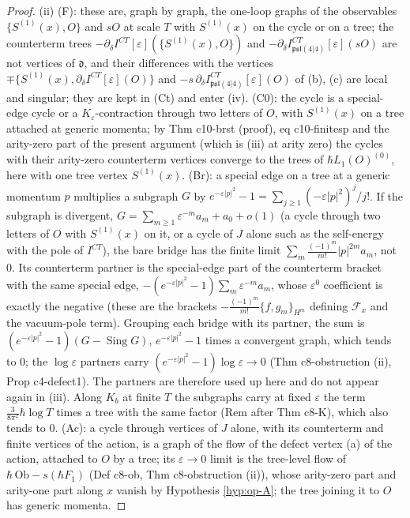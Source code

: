 \documentclass[11pt]{article}
\numberwithin{equation}{section}
\theoremstyle{plain}
\theoremstyle{definition}
\newcommand{\psl}{\mathfrak{psl}(4|4)}
\begin{document}
\begin{proof}
(ii) (F): these are, graph by graph, the one-loop graphs of the observables $\{S^{(1)}(x),O\}$ and $sO$ at scale $T$ with $S^{(1)}(x)$ on the cycle or on a tree; the counterterm trees $-\partial_\delta I^{CT}[\varepsilon](\{S^{(1)}(x),O\})$ and $-\partial_\delta I^{CT}_{\psl}[\varepsilon](sO)$ are not vertices of $\mathfrak d$, and their differences with the vertices $\mp\{S^{(1)}(x),\partial_\delta I^{CT}[\varepsilon](O)\}$ and $-s\,\partial_\delta I^{CT}_{\psl}[\varepsilon](O)$ of (b), (c) are local and singular; they are kept in (Ct) and enter (iv). (C0): the cycle is a special-edge cycle or a $K_\varepsilon$-contraction through two letters of $O$, with $S^{(1)}(x)$ on a tree attached at generic momenta; by Thm c10-brst (proof), eq c10-finitesp and the arity-zero part of the present argument (which is (iii) at arity zero) the cycles with their arity-zero counterterm vertices converge to the trees of $\hbar L_1(O)^{(0)}$, here with one tree vertex $S^{(1)}(x)$. (Br): a special edge on a tree at a generic momentum $p$ multiplies a subgraph $G$ by $e^{-\varepsilon|p|^2}-1=\sum_{j\ge1}(-\varepsilon|p|^2)^j/j!$. If the subgraph is divergent, $G=\sum_{m\ge1}\varepsilon^{-m}a_m+a_0+o(1)$ (a cycle through two letters of $O$ with $S^{(1)}(x)$ on it, or a cycle of $J$ alone such as the self-energy with the pole of $I^{CT}$), the bare bridge has the finite limit $\sum_m\frac{(-1)^m}{m!}|p|^{2m}a_m$, not $0$. Its counterterm partner is the special-edge part of the counterterm bracket with the same special edge, $-(e^{-\varepsilon|p|^2}-1)\sum_m\varepsilon^{-m}a_m$, whose $\varepsilon^0$ coefficient is exactly the negative (these are the brackets $-\frac{(-1)^m}{m!}\{f,g_m\}_{H^m}$ defining $\mathcal F_x$ and the vacuum-pole term). Grouping each bridge with its partner, the sum is $(e^{-\varepsilon|p|^2}-1)(G-\operatorname{Sing}G)$, $e^{-\varepsilon|p|^2}-1$ times a convergent graph, which tends to $0$; the $\log\varepsilon$ partners carry $(e^{-\varepsilon|p|^2}-1)\log\varepsilon\to0$ (Thm c8-obstruction (ii), Prop c4-defect1). The partners are therefore used up here and do not appear again in (iii). Along $K_b$ at finite $T$ the subgraphs carry at fixed $\varepsilon$ the term $\tfrac3{8\pi^2}\hbar\log T$ times a tree with the same factor (Rem after Thm c8-K), which also tends to $0$. (Ac): a cycle through vertices of $J$ alone, with its counterterm and finite vertices of the action, is a graph of the flow of the defect vertex (a) of the action, attached to $O$ by a tree; its $\varepsilon\to0$ limit is the tree-level flow of $\hbar\,\mathrm{Ob}-s(\hbar F_1)$ (Def c8-ob, Thm c8-obstruction (ii)), whose arity-zero part and arity-one part along $x$ vanish by Hypothesis \ref{hyp:op-A}; the tree joining it to $O$ has generic momenta.


\end{proof}
\end{document}
